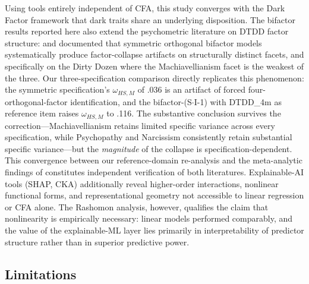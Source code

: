 \documentclass[11pt,twocolumn]{article}
\begin{document}
Using tools entirely independent of CFA, this study converges with the Dark Factor framework \citep{moshagen2018} that dark traits share an underlying disposition. The bifactor results reported here also extend the psychometric literature on DTDD factor structure: \citet{knitter2025} and \citet{eid2017} documented that symmetric orthogonal bifactor models systematically produce factor-collapse artifacts on structurally distinct facets, and specifically on the Dirty Dozen where the Machiavellianism facet is the weakest of the three. Our three-specification comparison directly replicates this phenomenon: the symmetric specification's $\omega_{HS,M}$ of .036 is an artifact of forced four-orthogonal-factor identification, and the bifactor-(S$\cdot$I-1) with DTDD\_4m as reference item raises $\omega_{HS,M}$ to .116. The substantive conclusion survives the correction---Machiavellianism retains limited specific variance across every specification, while Psychopathy and Narcissism consistently retain substantial specific variance---but the \textit{magnitude} of the collapse is specification-dependent. This convergence between our reference-domain re-analysis and the meta-analytic findings of \citet{knitter2025} constitutes independent verification of both literatures. Explainable-AI tools (SHAP, CKA) additionally reveal higher-order interactions, nonlinear functional forms, and representational geometry not accessible to linear regression or CFA alone. The Rashomon analysis, however, qualifies the claim that nonlinearity is empirically necessary: linear models performed comparably, and the value of the explainable-ML layer lies primarily in interpretability of predictor structure rather than in superior predictive power.

\subsection{Limitations}
\label{sec:limitations}
\end{document}
